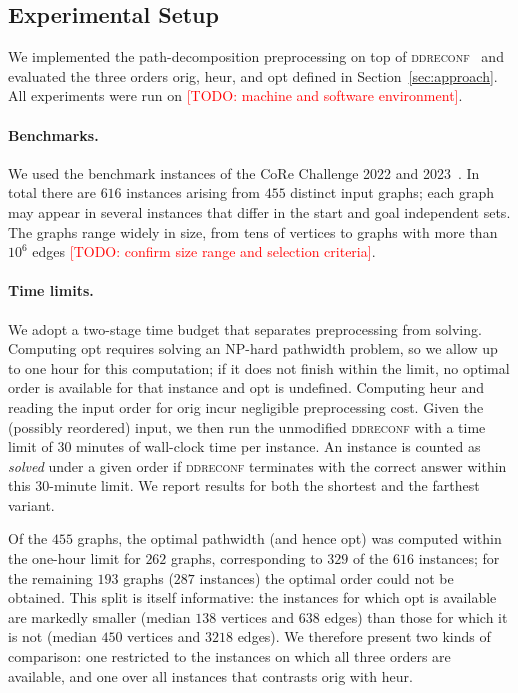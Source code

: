 \documentclass[conference]{IEEEtran}
\newcommand{\todo}[1]{\textcolor{red}{[TODO: #1]}}
\newcommand{\OrigDecom}{\textsf{orig}\xspace}
\newcommand{\HeurDecom}{\textsf{heur}\xspace}
\newcommand{\OptDecom}{\textsf{opt}\xspace}
\begin{document}
\subsection{Experimental Setup}
\label{subsec:setup}

We implemented the path-decomposition preprocessing on top of
\textsc{ddreconf}~\cite{ItoKNSSTT23} and evaluated the three orders
\OrigDecom, \HeurDecom, and \OptDecom defined in Section~\ref{sec:approach}.
All experiments were run on \todo{machine and software environment}.

\paragraph{Benchmarks.}
We used the benchmark instances of the CoRe Challenge 2022 and
2023~\cite{sotaokit24}. In total there are $616$ instances arising from $455$
distinct input graphs; each graph may appear in several instances that differ in
the start and goal independent sets.
The graphs range widely in size, from tens of vertices to graphs with more than
$10^{6}$ edges \todo{confirm size range and selection criteria}.

\paragraph{Time limits.}
We adopt a two-stage time budget that separates preprocessing from solving.
Computing \OptDecom requires solving an NP-hard pathwidth problem, so we allow up
to one hour for this computation; if it does not finish within the limit, no
optimal order is available for that instance and \OptDecom is undefined.
Computing \HeurDecom and reading the input order for \OrigDecom incur negligible
preprocessing cost.
Given the (possibly reordered) input, we then run the unmodified
\textsc{ddreconf} with a time limit of $30$ minutes of wall-clock time per
instance. An instance is counted as \emph{solved} under a given order if
\textsc{ddreconf} terminates with the correct answer within this $30$-minute
limit.
We report results for both the shortest and the farthest variant.

Of the $455$ graphs, the optimal pathwidth (and hence \OptDecom) was computed
within the one-hour limit for $262$ graphs, corresponding to $329$ of the $616$
instances; for the remaining $193$ graphs ($287$ instances) the optimal order
could not be obtained.
This split is itself informative: the instances for which \OptDecom is available
are markedly smaller (median $138$ vertices and $638$ edges) than those for which
it is not (median $450$ vertices and $3218$ edges). We therefore present two
kinds of comparison: one restricted to the instances on which all three orders
are available, and one over all instances that contrasts \OrigDecom with
\HeurDecom.
\end{document}
